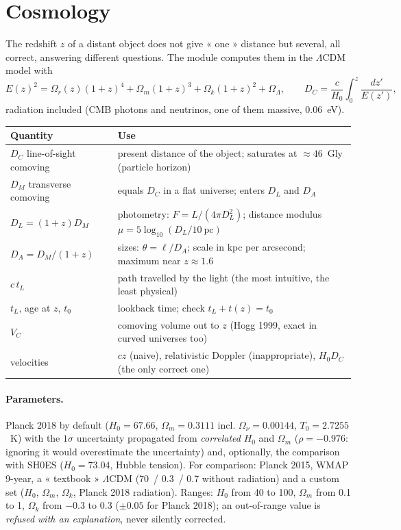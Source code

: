 \section{Cosmology}\label{sec:cosmo}
The redshift $z$ of a distant object does not give « one » distance but several, all correct, answering different
questions. The module computes them in the $\Lambda$CDM model with
\[ E(z)^2 = \Omega_r(z)(1+z)^4 + \Omega_m(1+z)^3 + \Omega_k(1+z)^2 + \Omega_\Lambda, \qquad
   D_C = \frac{c}{H_0}\int_0^z\frac{dz'}{E(z')}, \]
radiation included (CMB photons and neutrinos, one of them massive, 0.06~eV).
\begin{center}
\begin{tabularx}{\linewidth}{@{}lX@{}}
\toprule
Quantity & Use \\
\midrule
$D_C$ line-of-sight comoving & present distance of the object; saturates at $\approx 46$~Gly (particle horizon)\\
$D_M$ transverse comoving & equals $D_C$ in a flat universe; enters $D_L$ and $D_A$\\
$D_L = (1+z)D_M$ & photometry: $F = L/(4\pi D_L^2)$; distance modulus $\mu = 5\log_{10}(D_L/10~\mathrm{pc})$\\
$D_A = D_M/(1+z)$ & sizes: $\theta = \ell/D_A$; scale in kpc per arcsecond; maximum near $z\approx1.6$\\
$c\,t_L$ & path travelled by the light (the most intuitive, the least physical)\\
$t_L$, age at $z$, $t_0$ & lookback time; check $t_L + t(z) = t_0$\\
$V_C$ & comoving volume out to $z$ (Hogg 1999, exact in curved universes too)\\
velocities & $cz$ (naive), relativistic Doppler (inappropriate), $H_0 D_C$ (the only correct one)\\
\bottomrule
\end{tabularx}
\end{center}

\paragraph{Parameters.} Planck 2018 by default ($H_0 = 67.66$, $\Omega_m = 0.3111$ incl. $\Omega_\nu = 0.00144$,
$T_0 = 2.7255$~K) with the $1\sigma$ uncertainty propagated from \emph{correlated} $H_0$ and $\Omega_m$
($\rho = -0.976$: ignoring it would overestimate the uncertainty) and, optionally, the comparison with SH0ES
($H_0 = 73.04$, Hubble tension). For comparison: Planck 2015, WMAP 9-year, a « textbook » $\Lambda$CDM
(70~/ 0.3~/ 0.7 without radiation) and a custom set ($H_0$, $\Omega_m$, $\Omega_k$, Planck 2018 radiation).
Ranges: $H_0$ from 40 to 100, $\Omega_m$ from 0.1 to 1, $\Omega_k$ from $-0.3$ to $0.3$ ($\pm 0.05$ for Planck
2018); an out-of-range value is \emph{refused with an explanation}, never silently corrected.


